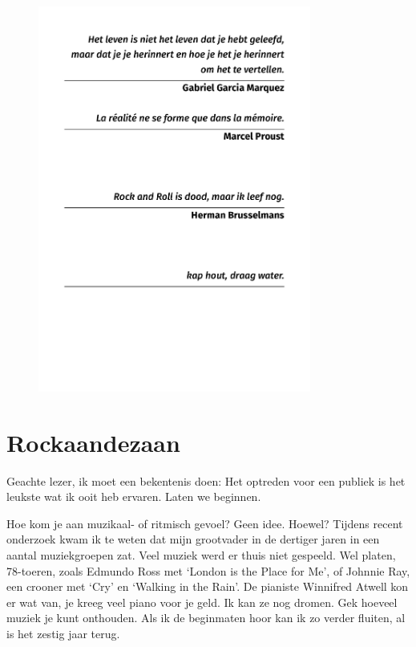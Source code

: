 \documentclass[10pt,twoside, openright]{memoir}
\begin{document}
\thispagestyle{empty}
\begin{flushright}
\begin{figure}
\includegraphics[width=0.8\textwidth, right]{img/epi/epi3}
\end{figure}
\end{flushright}

\chapter{Rockaandezaan}


\noindent Geachte lezer, ik moet een bekentenis doen: Het optreden voor een publiek is het leukste wat ik ooit heb ervaren. Laten we beginnen.

Hoe kom je aan muzikaal- of ritmisch gevoel? Geen idee. Hoewel? Tijdens recent onderzoek kwam ik te weten dat mijn grootvader in de dertiger jaren in een aantal muziekgroepen zat. Veel muziek werd er thuis niet gespeeld. Wel platen, 78-toeren, zoals Edmundo Ross met `London is the Place for Me', of Johnnie Ray, een crooner met `Cry' en `Walking in the Rain'. De pianiste Winnifred Atwell kon er wat van, je kreeg veel piano voor je geld. Ik kan ze nog dromen. Gek hoeveel muziek je kunt onthouden. Als ik de beginmaten hoor kan ik zo verder fluiten, al is het zestig jaar terug. 
\end{document}
